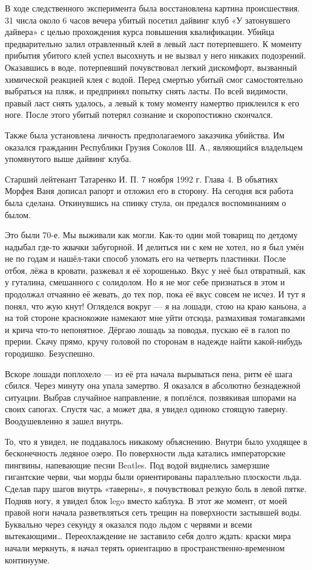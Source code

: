 В ходе следственного эксперимента была восстановлена картина происшествия. 31 числа около 6 часов вечера убитый посетил дайвинг клуб «У затонувшего дайвера» с целью прохождения курса повышения квалификации. Убийца предварительно залил отравленный клей в левый ласт потерпевшего. К моменту прибытия убитого клей успел высохнуть и не вызвал у него никаких подозрений. Оказавшись в воде, потерпевший почувствовал легкий дискомфорт, вызванный химической реакцией клея с водой. Перед смертью убитый смог самостоятельно выбраться на пляж, и предпринял попытку снять ласты. По всей видимости, правый ласт снять удалось, а левый к тому моменту намертво приклеился к его ноге. После этого убитый потерял сознание и скоропостижно скончался.


Также была установлена личность предполагаемого заказчика убийства. Им оказался гражданин Республики Грузия Соколов Ш. А., являющийся владельцем упомянутого выше дайвинг клуба.


Старший лейтенант
Татаренко И. П.                                                                          7 ноября 1992 г.
Глава 4. В объятиях Морфея
Ваня дописал рапорт и отложил его в сторону. На сегодня вся работа была сделана. Откинувшись на спинку стула, он предался воспоминаниям о былом.


Это были 70-е. Мы выживали как могли. Как-то один мой товарищ по детдому надыбал где-то жвачки забугорной. И делиться ни с кем не хотел, но я был умён не по годам и нашёл-таки способ уломать его на четверть пластинки. После отбоя, лёжа в кровати, разжевал я её хорошенько. Вкус у неё был отвратный, как у гуталина, смешанного с солидолом. Но я не мог себе признаться в этом и продолжал отчаянно её жевать, до тех пор, пока её вкус совсем не исчез. И тут я понял, что жую кнут! Огляделся вокруг --- я на лошади, стою на краю каньона, а на той стороне краснокожие намекают мне уйти отсюда, размахивая томагавками и крича что-то непонятное. Дёргаю лошадь за поводья, пускаю её в галоп по прерии. Скачу прямо, кручу головой по сторонам в надежде найти какой-нибудь городишко. Безуспешно.


Вскоре лошади поплохело --- из её рта начала вырываться пена, ритм её шага сбился. Через минуту она упала замертво. Я оказался в абсолютно безнадежной ситуации. Выбрав случайное направление, я поплёлся, позвякивая шпорами на своих сапогах. Спустя час, а может два, я увидел одиноко стоящую таверну. Воодушевленно я зашел внутрь.


То, что я увидел, не поддавалось никакому объяснению. Внутри было уходящее в бесконечность ледяное озеро. По поверхности льда катались императорские пингвины, напевающие песни Beatles. Под водой виднелись замерзшие гигантские черви, чьи морды были ориентированы параллельно плоскости льда. Сделав пару шагов внутрь «таверны», я почувствовал резкую боль в левой пятке. Подняв ногу, я увидел блок lego вместо каблука. В этот же момент, от моей правой ноги начала разветвляться сеть трещин на поверхности застывшей воды. Буквально через секунду я оказался подо льдом с червями и всеми вытекающими… Переохлаждение не заставило себя долго ждать: краски мира начали меркнуть, я начал терять ориентацию в пространственно-временном континууме.


